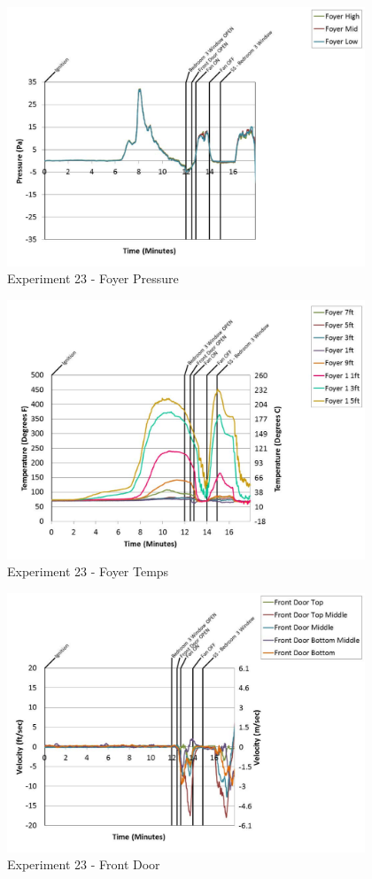 \documentclass{article}
\begin{document}
\begin{appendices}
	\begin{figure}[h!]
		\centering
		\includegraphics[height=3.05in]{0_Images/Results_Charts/Exp_23_Charts/FoyerPressure.pdf}
		\caption{Experiment 23 - Foyer Pressure}
	\end{figure}
 
	\clearpage

	\begin{figure}[h!]
		\centering
		\includegraphics[height=3.05in]{0_Images/Results_Charts/Exp_23_Charts/FoyerTemps.pdf}
		\caption{Experiment 23 - Foyer Temps}
	\end{figure}
 

	\begin{figure}[h!]
		\centering
		\includegraphics[height=3.05in]{0_Images/Results_Charts/Exp_23_Charts/FrontDoor.pdf}
		\caption{Experiment 23 - Front Door}
	\end{figure}
 

\end{appendices}
\end{document}

